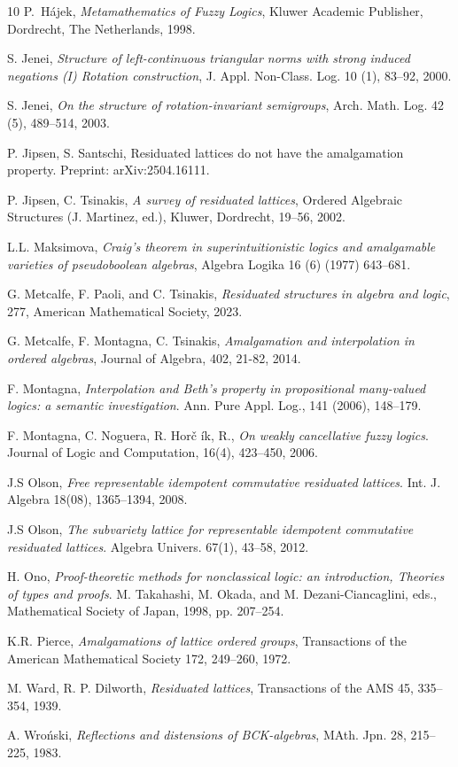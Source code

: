 \documentclass{amsart}
\theoremstyle{definition}
\numberwithin{equation}{section}
\begin{document}
\begin{thebibliography}{10}
P.~H\'ajek, {\em Metamathematics of Fuzzy Logics}, Kluwer Academic Publisher, Dordrecht, The Netherlands, 1998.

 S. Jenei, {\em Structure of left-continuous triangular norms with strong induced negations (I) Rotation construction}, J. Appl. Non-Class. Log. 10 (1), 83--92, 2000.

S. Jenei, {\em On the structure of rotation-invariant semigroups}, Arch. Math. Log. 42 (5), 489--514, 2003.
   
P. Jipsen, S. Santschi, Residuated lattices do not have the amalgamation property. Preprint: arXiv:2504.16111.

 P. Jipsen, C. Tsinakis, {\em A survey of residuated lattices}, Ordered Algebraic Structures (J. Martinez, ed.),
Kluwer, Dordrecht, 19--56, 2002.

  L.L. Maksimova, {\em Craig's theorem in superintuitionistic logics and amalgamable varieties of pseudoboolean algebras}, Algebra Logika 16 (6) (1977) 643--681.

G. Metcalfe, F. Paoli, and C. Tsinakis, {\em Residuated structures in algebra and logic}, 277, American Mathematical Society, 2023.

G. Metcalfe, F. Montagna, C. Tsinakis,  {\em Amalgamation and interpolation in ordered algebras}, Journal of Algebra, 402, 21-82, 2014.

F. Montagna, {\em Interpolation and Beth's property in propositional many-valued logics: a semantic investigation}. Ann. Pure Appl. Log., 141 (2006), 148--179.

F. Montagna, C. Noguera, R. Hor\v c \'ik, R., {\em On weakly cancellative fuzzy logics}. Journal of Logic and Computation, 16(4), 423--450, 2006.

J.S Olson, {\em Free representable idempotent commutative residuated lattices}. Int. J. Algebra 18(08), 1365--1394, 2008.

J.S Olson, {\em The subvariety lattice for representable idempotent commutative residuated lattices}. Algebra
Univers. 67(1), 43--58, 2012.

H. Ono, {\em Proof-theoretic methods for nonclassical logic: an introduction, Theories of types and proofs}. M. Takahashi, M. Okada, and M. Dezani-Ciancaglini, eds., Mathematical Society
of Japan, 1998, pp. 207--254.

K.R. Pierce, {\em Amalgamations of lattice ordered groups}, Transactions of the American Mathematical Society 172, 249--260, 1972.

M. Ward, R. P. Dilworth, {\em Residuated lattices}, Transactions of the AMS 45, 335--354, 1939.

A. Wro\'nski, {\em Reflections and distensions of BCK-algebras}, MAth. Jpn. 28, 215--225, 1983.
\end{thebibliography}
\end{document}

